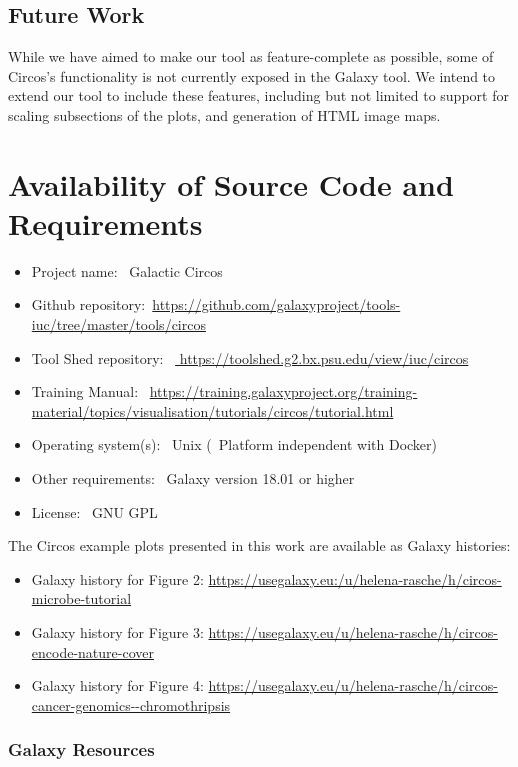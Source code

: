 \subsection*{Future Work}
While we have aimed to make our tool as feature-complete as possible, some of Circos's functionality is not currently exposed in the Galaxy tool. We intend to extend our tool to include these features, including but not limited to support for scaling subsections of the plots, and generation of HTML image maps.

\section*{Availability of Source Code and Requirements}
\begin{itemize}
\item Project name: ~Galactic Circos
\item Github repository:~\url{https://github.com/galaxyproject/tools-iuc/tree/master/tools/circos}
\item Tool Shed repository: ~\url{ https://toolshed.g2.bx.psu.edu/view/iuc/circos}
\item Training Manual: ~\url{https://training.galaxyproject.org/training-material/topics/visualisation/tutorials/circos/tutorial.html}
\item Operating system(s): ~Unix (~Platform independent with Docker)
\item Other requirements: ~Galaxy version 18.01 or higher
\item License: ~GNU GPL
\end{itemize}

The Circos example plots presented in this work are available as Galaxy histories:

\begin{itemize}
\item Galaxy history for Figure 2: \url{https://usegalaxy.eu:/u/helena-rasche/h/circos-microbe-tutorial}
\item Galaxy history for Figure 3: \url{https://usegalaxy.eu/u/helena-rasche/h/circos-encode-nature-cover}
\item Galaxy history for Figure 4: \url{https://usegalaxy.eu/u/helena-rasche/h/circos-cancer-genomics--chromothripsis}
\end{itemize}

\subsubsection*{Galaxy Resources}

